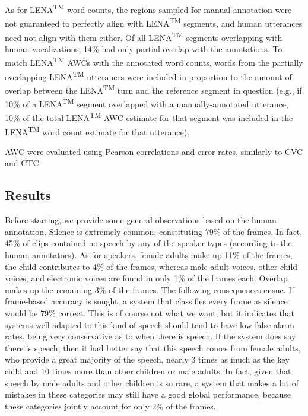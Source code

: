 \documentclass[english,floatsintext,man]{apa6}
\begin{document}
As for LENA\textsuperscript{TM} word counts, the regions sampled for
manual annotation were not guaranteed to perfectly align with
LENA\textsuperscript{TM} segments, and human utterances need not align
with them either. Of all LENA\textsuperscript{TM} segments overlapping
with human vocalizations, 14\% had only partial overlap with the
annotations. To match LENA\textsuperscript{TM} AWCs with the annotated
word counts, words from the partially overlapping
LENA\textsuperscript{TM} utterances were included in proportion to the
amount of overlap between the LENA\textsuperscript{TM} turn and the
reference segment in question (e.g., if 10\% of a
LENA\textsuperscript{TM} segment overlapped with a manually-annotated
utterance, 10\% of the total LENA\textsuperscript{TM} AWC estimate for
that segment was included in the LENA\textsuperscript{TM} word count
estimate for that utterance).

AWC were evaluated using Pearson correlations and error rates, similarly
to CVC and CTC.

\subsection{Results}\label{results}

Before starting, we provide some general observations based on the human
annotation. Silence is extremely common, constituting 79\% of the
frames. In fact, 45\% of clips contained no speech by any of the speaker
types (according to the human annotators). As for speakers, female
adults make up 11\% of the frames, the child contributes to 4\% of the
frames, whereas male adult voices, other child voices, and electronic
voices are found in only 1\% of the frames each. Overlap makes up the
remaining 3\% of the frames. The following consequences ensue. If
frame-based accuracy is sought, a system that classifies every frame as
silence would be 79\% correct. This is of course not what we want, but
it indicates that systems well adapted to this kind of speech should
tend to have low false alarm rates, being very conservative as to when
there is speech. If the system does say there is speech, then it had
better say that this speech comes from female adults, who provide a
great majority of the speech, nearly 3 times as much as the key child
and 10 times more than other children or male adults. In fact, given
that speech by male adults and other children is so rare, a system that
makes a lot of mistakes in these categories may still have a good global
performance, because these categories jointly account for only 2\% of
the frames.
\end{document}
